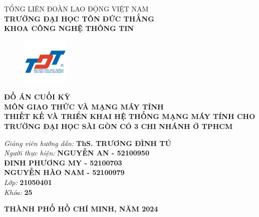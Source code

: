 \documentclass[12pt, a4paper]{article}
\begin{document}
	\begin{center} 
		\large TỔNG LIÊN ĐOÀN LAO ĐỘNG VIỆT NAM 
		\\ \textbf{TRƯỜNG ĐẠI HỌC TÔN ĐỨC THẮNG} 
		\\ \textbf{KHOA CÔNG NGHỆ THÔNG TIN} 
		\large
		\begin{figure}[H]
			\centering
			\includegraphics[width=0.2\textwidth]{logo_tdtu.jpg}
			\label{fig:logoTDT_1}
		\end{figure}
		{\large \textbf{ĐỒ ÁN CUỐI KỲ\\}}
		{\large \textbf{MÔN GIAO THỨC VÀ MẠNG MÁY TÍNH}}
		\\ [35pt]
		{\huge \textbf{THIẾT KẾ VÀ TRIỂN KHAI HỆ THỐNG MẠNG MÁY TÍNH CHO TRƯỜNG ĐẠI HỌC SÀI GÒN CÓ 3 CHI NHÁNH Ở TPHCM}}\\ [35pt]
		\begin{flushright}
			{\large \textit{Giảng viên hướng dẫn: }} 
			\textbf{ThS. TRƯƠNG ĐÌNH TÚ } \\
			{\large \textit{Người thực hiện: }} 
			\textbf{NGUYỄN AN - 52100950} \\
			\textbf{ĐINH PHƯƠNG MY  - 52100703} \\
			\textbf{NGUYỄN HÀO NAM - 52100979} \\	
			{\large \textit{Lớp: }} 
			\textbf{21050401 } \\
			{\large \textit{Khóa: }} 
			\textbf{25} \\ [35pt]
		\end{flushright} 
		{\large \textbf{THÀNH PHỐ HỒ CHÍ MINH, NĂM 2024}}\\
	\end{center}
	
\end{document}
